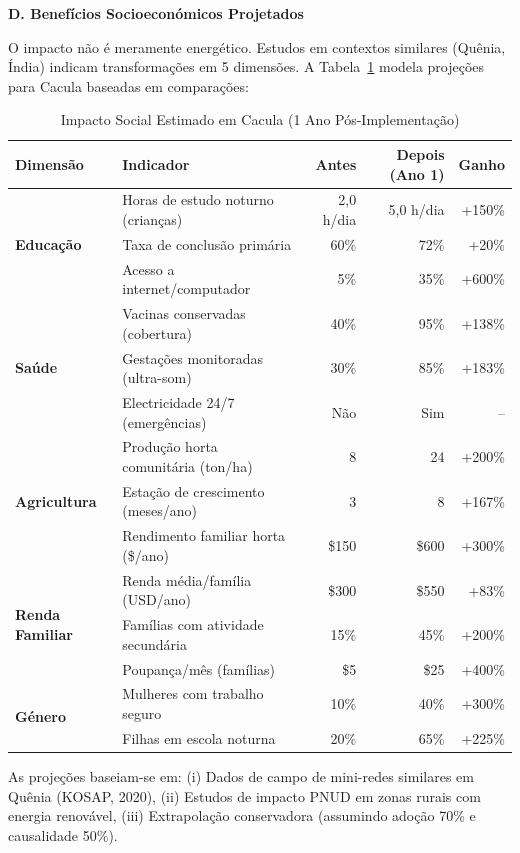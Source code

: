 \documentclass[12pt, a4paper]{article}
\begin{document}
\begin{itemize}
\textbf{D. Benefícios Socioeconómicos Projetados}

O impacto não é meramente energético. Estudos em contextos similares (Quênia, Índia) 
indicam transformações em 5 dimensões. A Tabela~\ref{tab:cacula_impact} modela projeções 
para Cacula baseadas em comparações:

\begin{table}[H]
\centering
\caption{Impacto Social Estimado em Cacula (1 Ano Pós-Implementação)}
\label{tab:cacula_impact}
\small
\begin{tabular}{|l|l|r|r|r|}
\hline
\textbf{Dimensão} & \textbf{Indicador} & \textbf{Antes} & \textbf{Depois (Ano 1)} & \textbf{Ganho} \\
\hline
\multirow{3}{*}{\textbf{Educação}} 
  & Horas de estudo noturno (crianças) & 2,0 h/dia & 5,0 h/dia & +150\% \\
  & Taxa de conclusão primária & 60\% & 72\% & +20\% \\
  & Acesso a internet/computador & 5\% & 35\% & +600\% \\
\hline
\multirow{3}{*}{\textbf{Saúde}}
  & Vacinas conservadas (cobertura) & 40\% & 95\% & +138\% \\
  & Gestações monitoradas (ultra-som) & 30\% & 85\% & +183\% \\
  & Electricidade 24/7 (emergências) & Não & Sim & -- \\
\hline
\multirow{3}{*}{\textbf{Agricultura}}
  & Produção horta comunitária (ton/ha) & 8 & 24 & +200\% \\
  & Estação de crescimento (meses/ano) & 3 & 8 & +167\% \\
  & Rendimento familiar horta (\$/ano) & \$150 & \$600 & +300\% \\
\hline
\multirow{3}{*}{\textbf{Renda Familiar}}
  & Renda média/família (USD/ano) & \$300 & \$550 & +83\% \\
  & Famílias com atividade secundária & 15\% & 45\% & +200\% \\
  & Poupança/mês (famílias) & \$5 & \$25 & +400\% \\
\hline
\multirow{2}{*}{\textbf{Género}}
  & Mulheres com trabalho seguro & 10\% & 40\% & +300\% \\
  & Filhas em escola noturna & 20\% & 65\% & +225\% \\
\hline
\end{tabular}
\end{table}

As projeções baseiam-se em: (i) Dados de campo de mini-redes similares em Quênia 
(KOSAP, 2020), (ii) Estudos de impacto PNUD em zonas rurais com energia renovável, 
(iii) Extrapolação conservadora (assumindo adoção 70\% e causalidade 50\%).


\end{itemize}
\end{document}
